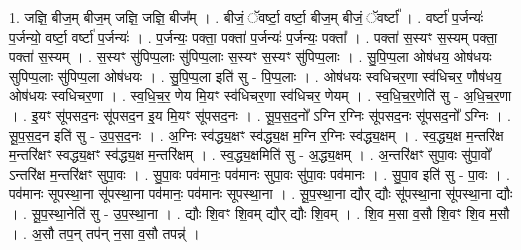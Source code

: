 \documentclass[17pt]{extarticle}
\begin{document}
1. जज्ञि॒ बीज॒म् बीज॒म् जज्ञि॒ जज्ञि॒ बीज᳚म् । . बीजं॒ ॅवर्ष्टा॒ वर्ष्टा॒ बीज॒म् बीजं॒ ॅवर्ष्टा᳚ । . वर्ष्टा॑ प॒र्जन्यः॑ प॒र्जन्यो॒ वर्ष्टा॒ वर्ष्टा॑ प॒र्जन्यः॑ । . प॒र्जन्यः॒ पक्ता॒ पक्ता॑ प॒र्जन्यः॑ प॒र्जन्यः॒ पक्ता᳚ । . पक्ता॑ स॒स्यꣳ स॒स्यम् पक्ता॒ पक्ता॑ स॒स्यम् । . स॒स्यꣳ सु॑पिप्प॒लाः सु॑पिप्प॒लाः स॒स्यꣳ स॒स्यꣳ सु॑पिप्प॒लाः । . सु॒पि॒प्प॒ला ओष॑धय॒ ओष॑धयः सुपिप्प॒लाः सु॑पिप्प॒ला ओष॑धयः । . सु॒पि॒प्प॒ला इति॑ सु - पि॒प्प॒लाः । . ओष॑धयः स्वधिचर॒णा स्व॑धिचर॒ णौष॑धय॒ ओष॑धयः स्वधिचर॒णा । . स्व॒धि॒च॒र॒ णेय मि॒यꣳ स्व॑धिचर॒णा स्व॑धिचर॒ णेयम् । . स्व॒धि॒च॒र॒णेति॑ सु - अ॒धि॒च॒र॒णा । . इ॒यꣳ सू॑पसद॒नः सू॑पसद॒न इ॒य मि॒यꣳ सू॑पसद॒नः । . सू॒प॒स॒द॒नो᳚ ऽग्नि र॒ग्निः सू॑पसद॒नः सू॑पसद॒नो᳚ ऽग्निः । . सू॒प॒स॒द॒न इति॑ सु - उ॒प॒स॒द॒नः । . अ॒ग्निः स्व॑द्ध्य॒क्षꣳ स्व॑द्ध्य॒क्ष म॒ग्नि र॒ग्निः स्व॑द्ध्य॒क्षम् । . स्व॒द्ध्य॒क्ष म॒न्तरि॑क्ष म॒न्तरि॑क्षꣳ स्वद्ध्य॒क्षꣳ स्व॑द्ध्य॒क्ष म॒न्तरि॑क्षम् । . स्व॒द्ध्य॒क्षमिति॑ सु - अ॒द्ध्य॒क्षम् । . अ॒न्तरि॑क्षꣳ सुपा॒वः सु॑पा॒वो᳚ ऽन्तरि॑क्ष म॒न्तरि॑क्षꣳ सुपा॒वः । . सु॒पा॒वः पव॑मानः॒ पव॑मानः सुपा॒वः सु॑पा॒वः पव॑मानः । . सु॒पा॒व इति॑ सु - पा॒वः । . पव॑मानः सूपस्था॒ना सू॑पस्था॒ना पव॑मानः॒ पव॑मानः सूपस्था॒ना । . सू॒प॒स्था॒ना द्यौर् द्यौः सू॑पस्था॒ना सू॑पस्था॒ना द्यौः । . सू॒प॒स्था॒नेति॑ सु - उ॒प॒स्था॒ना । . द्यौः शि॒वꣳ शि॒वम् द्यौर् द्यौः शि॒वम् । . शि॒व म॒सा व॒सौ शि॒वꣳ शि॒व म॒सौ । . अ॒सौ तप॒न् तप॑न् न॒सा व॒सौ तपन्न्॑ । \newline
\end{document}
